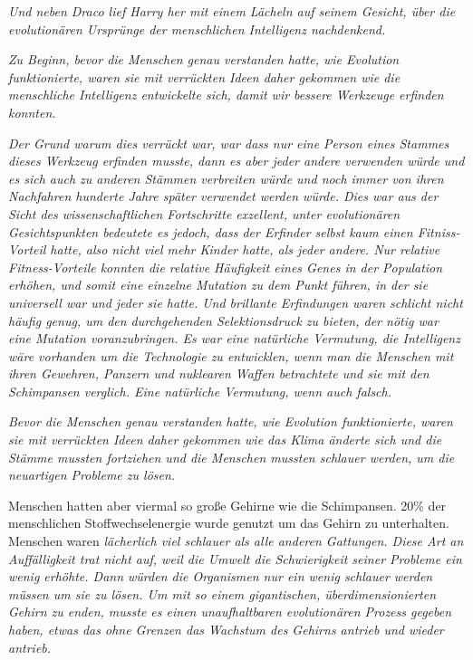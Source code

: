 {\emph{Und neben Draco lief Harry her mit einem Lächeln auf seinem Gesicht, über die evolutionären Ursprünge der menschlichen Intelligenz nachdenkend.}

\emph{Zu Beginn, bevor die Menschen genau verstanden hatte, wie Evolution funktionierte, waren sie mit verrückten Ideen daher gekommen wie die menschliche Intelligenz entwickelte sich, damit wir bessere Werkzeuge erfinden konnten.}

\emph{Der Grund warum dies verrückt war, war dass nur eine Person eines Stammes dieses Werkzeug erfinden musste, dann es aber jeder andere verwenden würde und es sich auch zu anderen Stämmen verbreiten würde und noch immer von ihren Nachfahren hunderte Jahre später verwendet werden würde. Dies war aus der Sicht des wissenschaftlichen Fortschritte exzellent, unter evolutionären Gesichtspunkten bedeutete es jedoch, dass der Erfinder selbst kaum einen Fitniss-Vorteil hatte, also nicht viel mehr Kinder hatte, als jeder andere. Nur relative Fitness-Vorteile konnten die relative Häufigkeit eines Genes in der Population erhöhen, und somit eine einzelne Mutation zu dem Punkt führen, in der sie universell war und jeder sie hatte. Und brillante Erfindungen waren schlicht nicht häufig genug, um den durchgehenden Selektionsdruck zu bieten, der nötig war eine Mutation voranzubringen. Es war eine natürliche Vermutung, die Intelligenz wäre vorhanden um die Technologie zu entwicklen, wenn man die Menschen mit ihren Gewehren, Panzern und nuklearen Waffen betrachtete und sie mit den Schimpansen verglich. Eine natürliche Vermutung, wenn auch falsch.}

\emph{Bevor die Menschen genau verstanden hatte, wie Evolution funktionierte, waren sie mit verrückten Ideen daher gekommen wie das Klima änderte sich und die Stämme mussten fortziehen und die Menschen mussten schlauer werden, um die neuartigen Probleme zu lösen.}

Menschen hatten aber viermal so große Gehirne wie die Schimpansen. 20\% der menschlichen Stoffwechselenergie wurde genutzt um das Gehirn zu unterhalten. Menschen waren \emph{lächerlich viel schlauer als alle anderen Gattungen. Diese Art an Auffälligkeit trat nicht auf, weil die Umwelt die Schwierigkeit seiner Probleme ein wenig erhöhte. Dann würden die Organismen nur ein wenig schlauer werden müssen um sie zu lösen. Um mit so einem gigantischen, überdimensionierten Gehirn zu enden, musste es einen \emph{unaufhaltbaren} evolutionären Prozess gegeben haben, etwas das ohne Grenzen das Wachstum des Gehirns antrieb und wieder antrieb.}

}

